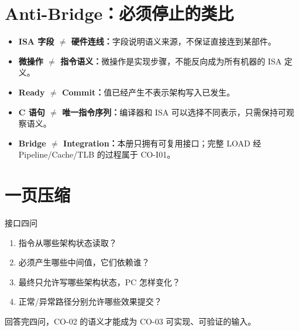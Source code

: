 \documentclass[UTF8,fontset=fandol,11pt,a4paper]{ctexart}
\newcommand{\kw}[1]{\textbf{\color{deep}#1}}
\begin{document}
\section{Anti-Bridge：必须停止的类比}

\begin{itemize}
  \item \kw{ISA 字段 $\neq$ 硬件连线：}字段说明语义来源，不保证直接连到某部件。
  \item \kw{微操作 $\neq$ 指令语义：}微操作是实现步骤，不能反向成为所有机器的 ISA 定义。
  \item \kw{Ready $\neq$ Commit：}值已经产生不表示架构写入已发生。
  \item \kw{C 语句 $\neq$ 唯一指令序列：}编译器和 ISA 可以选择不同表示，只需保持可观察语义。
  \item \kw{Bridge $\neq$ Integration：}本册只拥有可复用接口；完整 LOAD 经 Pipeline/Cache/TLB 的过程属于 CO-I01。
\end{itemize}

\section{一页压缩}

\begin{corebox}{接口四问}
\begin{enumerate}
  \item 指令从哪些架构状态读取？
  \item 必须产生哪些中间值，它们依赖谁？
  \item 最终只允许写哪些架构状态，PC 怎样变化？
  \item 正常/异常路径分别允许哪些效果提交？
\end{enumerate}
回答完四问，CO-02 的语义才能成为 CO-03 可实现、可验证的输入。
\end{corebox}
\end{document}
